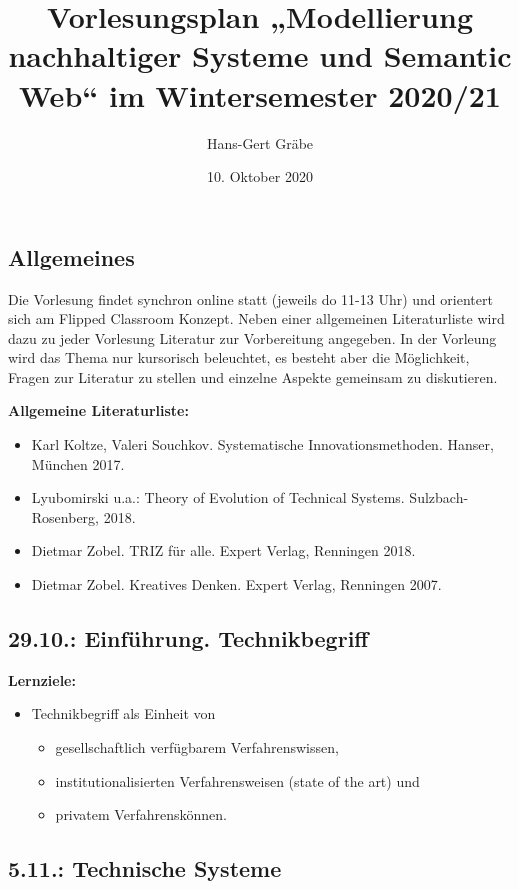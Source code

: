\documentclass[11pt,a4paper]{article}
\title{Vorlesungsplan „Modellierung nachhaltiger Systeme und Semantic Web“ im
  Wintersemester 2020/21}
\author{Hans-Gert Gr\"abe}
\date{10. Oktober 2020}
\begin{document}
\maketitle
\subsection{Allgemeines}

Die Vorlesung findet synchron online statt (jeweils do 11-13 Uhr) und
orientert sich am Flipped Classroom Konzept. Neben einer allgemeinen
Literaturliste wird dazu zu jeder Vorlesung Literatur zur Vorbereitung
angegeben. In der Vorleung wird das Thema nur kursorisch beleuchtet, es
besteht aber die Möglichkeit, Fragen zur Literatur zu stellen und einzelne
Aspekte gemeinsam zu diskutieren.

\textbf{Allgemeine Literaturliste:}
\begin{itemize}[noitemsep]
\item Karl Koltze, Valeri Souchkov. Systematische Innovationsmethoden. Hanser,
  München 2017.
\item Lyubomirski u.a.: Theory of Evolution of Technical Systems.
  Sulzbach-Rosenberg, 2018.
\item Dietmar Zobel. TRIZ für alle. Expert Verlag, Renningen 2018.
\item Dietmar Zobel. Kreatives Denken. Expert Verlag, Renningen 2007.
\end{itemize}
\newpage
\tableofcontents
\newpage
\subsection{29.10.: Einführung. Technikbegriff}

\textbf{Lernziele:}
\begin{itemize}[noitemsep]
\item Technikbegriff als Einheit von 
  \begin{itemize}[noitemsep]
  \item gesellschaftlich verfügbarem Verfahrenswissen,
  \item institutionalisierten Verfahrensweisen (state of the art) und
  \item privatem Verfahrenskönnen.
  \end{itemize}
\end{itemize}

\subsection{5.11.: Technische Systeme}
\end{document}
